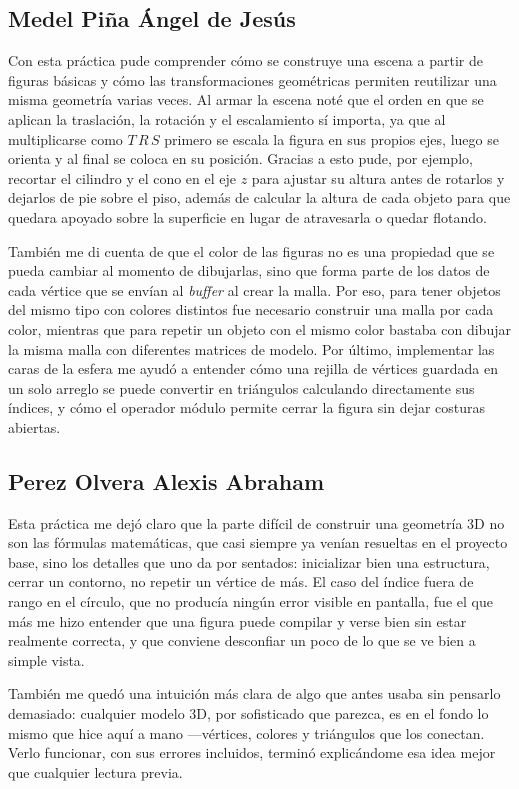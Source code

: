     \subsection{Medel Piña Ángel de Jesús}
    Con esta práctica pude comprender cómo se construye una escena a partir de figuras básicas y cómo las transformaciones geométricas permiten reutilizar una misma geometría varias veces. Al armar la escena noté que el orden en que se aplican la traslación, la rotación y el escalamiento sí importa, ya que al multiplicarse como $T\,R\,S$ primero se escala la figura en sus propios ejes, luego se orienta y al final se coloca en su posición. Gracias a esto pude, por ejemplo, recortar el cilindro y el cono en el eje $z$ para ajustar su altura antes de rotarlos y dejarlos de pie sobre el piso, además de calcular la altura de cada objeto para que quedara apoyado sobre la superficie en lugar de atravesarla o quedar flotando.

    También me di cuenta de que el color de las figuras no es una propiedad que se pueda cambiar al momento de dibujarlas, sino que forma parte de los datos de cada vértice que se envían al \textit{buffer} al crear la malla. Por eso, para tener objetos del mismo tipo con colores distintos fue necesario construir una malla por cada color, mientras que para repetir un objeto con el mismo color bastaba con dibujar la misma malla con diferentes matrices de modelo. Por último, implementar las caras de la esfera me ayudó a entender cómo una rejilla de vértices guardada en un solo arreglo se puede convertir en triángulos calculando directamente sus índices, y cómo el operador módulo permite cerrar la figura sin dejar costuras abiertas.

    \subsection{Perez Olvera Alexis Abraham}
    Esta práctica me dejó claro que la parte difícil de construir una geometría 3D no son las fórmulas matemáticas, que casi siempre ya venían resueltas en el proyecto base, sino los detalles que uno da por sentados: inicializar bien una estructura, cerrar un contorno, no repetir un vértice de más. El caso del índice fuera de rango en el círculo, que no producía ningún error visible en pantalla, fue el que más me hizo entender que una figura puede compilar y verse bien sin estar realmente correcta, y que conviene desconfiar un poco de lo que se ve bien a simple vista.

    También me quedó una intuición más clara de algo que antes usaba sin pensarlo demasiado: cualquier modelo 3D, por sofisticado que parezca, es en el fondo lo mismo que hice aquí a mano —vértices, colores y triángulos que los conectan. Verlo funcionar, con sus errores incluidos, terminó explicándome esa idea mejor que cualquier lectura previa.


